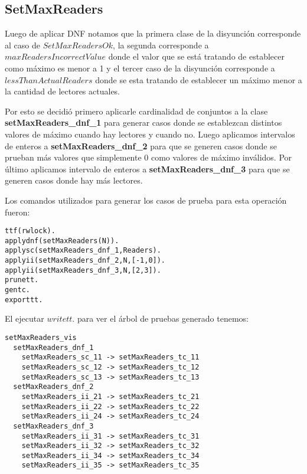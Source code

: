 \documentclass[a4paper, 12pt]{article}
\begin{document}
\subsection{SetMaxReaders}
Luego de aplicar DNF notamos que la primera clase de la disyunción corresponde al caso de $SetMaxReadersOk$, la segunda corresponde a $maxReadersIncorrectValue$ donde el valor que se está tratando de establecer como máximo es menor a 1 y el tercer caso de la disyunción corresponde a $lessThanActualReaders$ donde se esta tratando de establecer un máximo menor a la cantidad de lectores actuales. 

Por esto se decidió primero aplicarle cardinalidad de conjuntos a la clase \textbf{setMaxReaders\_dnf\_1} para generar casos donde se establezcan distintos valores de máximo cuando hay lectores y cuando no.
Luego aplicamos intervalos de enteros a \textbf{setMaxReaders\_dnf\_2} para que se generen casos donde se prueban más valores que simplemente 0 como valores de máximo inválidos.
Por último aplicamos intervalo de enteros a \textbf{setMaxReaders\_dnf\_3} para que se generen casos donde hay más lectores.

Los comandos utilizados para generar los casos de prueba para esta operación fueron:
\begin{verbatim}
ttf(rwlock).
applydnf(setMaxReaders(N)).
applysc(setMaxReaders_dnf_1,Readers).
applyii(setMaxReaders_dnf_2,N,[-1,0]).
applyii(setMaxReaders_dnf_3,N,[2,3]).
prunett.
gentc.
exporttt.
\end{verbatim}

El ejecutar $writett.$ para ver el árbol de pruebas generado tenemos:
\begin{verbatim}
setMaxReaders_vis
  setMaxReaders_dnf_1
    setMaxReaders_sc_11 -> setMaxReaders_tc_11
    setMaxReaders_sc_12 -> setMaxReaders_tc_12
    setMaxReaders_sc_13 -> setMaxReaders_tc_13
  setMaxReaders_dnf_2
    setMaxReaders_ii_21 -> setMaxReaders_tc_21
    setMaxReaders_ii_22 -> setMaxReaders_tc_22
    setMaxReaders_ii_24 -> setMaxReaders_tc_24
  setMaxReaders_dnf_3
    setMaxReaders_ii_31 -> setMaxReaders_tc_31
    setMaxReaders_ii_32 -> setMaxReaders_tc_32
    setMaxReaders_ii_34 -> setMaxReaders_tc_34
    setMaxReaders_ii_35 -> setMaxReaders_tc_35
\end{verbatim}
\end{document}

